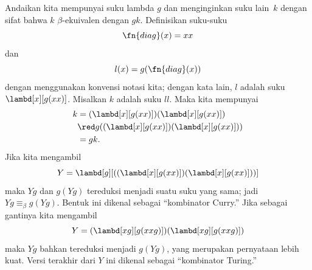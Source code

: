 \documentclass[../../../include/open-logic-section]{subfiles}
\begin{document}

Andaikan kita mempunyai suku lambda $g$ dan menginginkan suku lain~$k$ dengan
sifat bahwa $k$ $\beta$-ekuivalen dengan $gk$. Definisikan suku-suku
\[
\fn{diag}(x) = xx
\]
dan
\[
l(x) = g(\fn{diag}(x))
\]
dengan menggunakan konvensi notasi kita; dengan kata lain, $l$ adalah suku
$\lambd[x][g(xx)]$. Misalkan $k$ adalah suku $ll$. Maka kita mempunyai
\begin{align*}
k & = (\lambd[x][g(xx)])(\lambd[x][g(xx)]) \\
& \red  g((\lambd[x][g(xx)])(\lambd[x][g(xx)])) \\
& = gk.
\end{align*}
Jika kita mengambil
\[
Y = \lambd[g][((\lambd[x][g(xx)])(\lambd[x][g(xx)]))]
\]
maka $Yg$ dan $g(Yg)$ tereduksi menjadi suatu suku yang sama; jadi
$Yg \equiv_\beta g(Yg)$. Bentuk ini dikenal sebagai ``kombinator Curry.'' Jika
sebagai gantinya kita mengambil
\[
Y = (\lambd[xg][g(xxg)])(\lambd[xg][g(xxg)])
\]
maka $Yg$ bahkan tereduksi menjadi $g(Yg)$, yang merupakan pernyataan lebih
kuat. Versi terakhir dari $Y$ ini dikenal sebagai ``kombinator Turing.''
\end{document}
